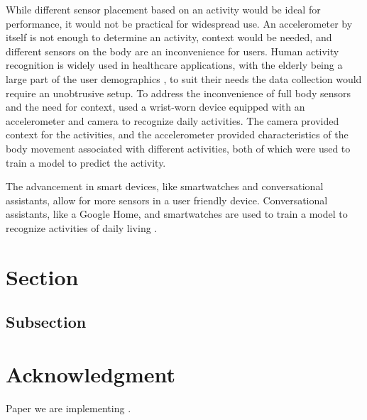 \documentclass[conference]{IEEEtran}
\begin{document}
While different sensor placement based on an activity would be ideal for performance, it would not be practical for widespread use.
An accelerometer by itself is not enough to determine an activity, context would be needed, and different sensors on the body are an inconvenience for users. 
Human activity recognition is widely used in healthcare applications, with the elderly being a large part of the user demographics \cite{2018_Robust_Activity}, to suit their needs the data collection would require an unobtrusive setup.
To address the inconvenience of full body sensors and the need for context, \cite{2012_WristSense} used a wrist-worn device equipped with an accelerometer and camera to recognize daily activities. 
The camera provided context for the activities, and the accelerometer provided characteristics of the body movement associated with different activities, both of which were used to train a model to predict the activity.

The advancement in smart devices, like smartwatches and conversational assistants, allow for more sensors in a user friendly device.
Conversational assistants, like a Google Home, and smartwatches are used to train a model to recognize activities of daily living \cite{2021_Ok_Google} \cite{2022_Leveraging_sound}.



\section{Section}

\subsection{Subsection}

\section*{Acknowledgment}

Paper we are implementing \cite{2022_Leveraging_sound}.

\nocite{*}
\printbibliography
\end{document}
